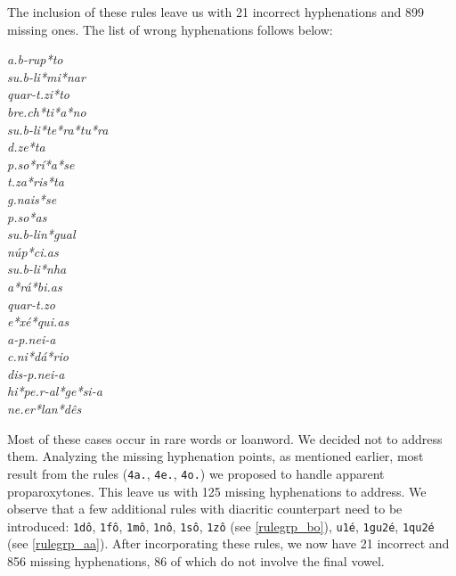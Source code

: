 The inclusion of these rules leave us with 21 incorrect hyphenations and 899 missing ones.
The list of wrong hyphenations follows below:
\begin{multicols}{5}
\setlength{\columnsep}{0pt}
\setlength{\parindent}{0pt}
\emph{a.b-rup*to \\ su.b-li*mi*nar \\ quar-t.zi*to \\ bre.ch*ti*a*no \\ su.b-li*te*ra*tu*ra \\ d.ze*ta \\ p.so*rí*a*se \\ t.za*ris*ta \\ g.nais*se \\ p.so*as \\ su.b-lin*gual \\ núp*ci.as \\ su.b-li*nha \\ a*rá*bi.as \\ quar-t.zo \\ e*xé*qui.as \\ a-p.nei-a \\ c.ni*dá*rio \\ dis-p.nei-a \\ hi*pe.r-al*ge*si-a \\ ne.er*lan*dês}
\end{multicols}
\noindent{}Most of these cases occur in rare words or loanword. We decided not to address them.
Analyzing the missing hyphenation points, as mentioned earlier, most result from the rules (\texttt{4a.}, \texttt{4e.}, \texttt{4o.})
we proposed to handle apparent proparoxytones. This leave us with 125 missing hyphenations to address.
We observe that a few additional rules with diacritic counterpart need to be introduced: 
\texttt{1dô}, \texttt{1fô}, \texttt{1mô}, \texttt{1nô}, \texttt{1sô}, \texttt{1zô} (see \cref{rulegrp_bo}), 
\texttt{u1é}, \texttt{1gu2é}, \texttt{1qu2é} (see \cref{rulegrp_aa}).
After incorporating these rules, we now have 21 incorrect and 856 missing hyphenations, 86 of which do not involve the final vowel.

